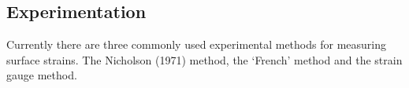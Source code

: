 \subsection{Experimentation}
Currently there are three commonly used experimental methods for measuring
surface strains. The Nicholson (1971) method, the `French' method and the strain
gauge method.